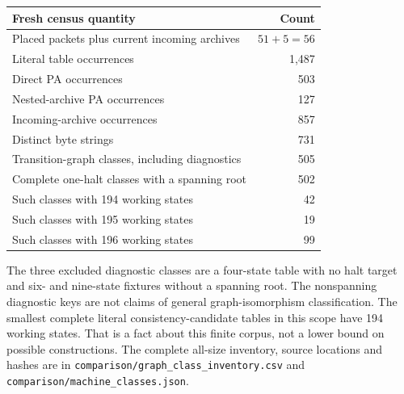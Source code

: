 \documentclass[11pt,letterpaper]{article}
\newcommand{\file}[1]{\texttt{\nolinkurl{#1}}}
\begin{document}
\begin{center}
\begin{tabular}{@{}lr@{}}
\toprule
Fresh census quantity & Count\\
\midrule
Placed packets plus current incoming archives & $51+5=56$\\
Literal table occurrences & 1,487\\
Direct PA occurrences & 503\\
Nested-archive PA occurrences & 127\\
Incoming-archive occurrences & 857\\
Distinct byte strings & 731\\
Transition-graph classes, including diagnostics & 505\\
Complete one-halt classes with a spanning root & 502\\
Such classes with 194 working states & 42\\
Such classes with 195 working states & 19\\
Such classes with 196 working states & 99\\
\bottomrule
\end{tabular}
\end{center}

The three excluded diagnostic classes are a four-state table with no halt
target and six- and nine-state fixtures without a spanning root. The
nonspanning diagnostic keys are not claims of general graph-isomorphism
classification. The smallest complete literal consistency-candidate tables in this scope have 194 working
states. That is a fact about this finite corpus, not a lower bound on possible
constructions. The complete all-size inventory, source locations and hashes
are in \file{comparison/graph_class_inventory.csv} and
\file{comparison/machine_classes.json}.
\end{document}
